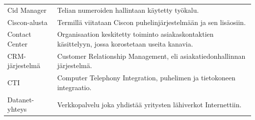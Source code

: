 \documentclass[finnish,12pt,a4paper,pdftex]{article}
\begin{document}
\begin{table}[h!]
\begin{tabular}{ p{5cm}  p{\textwidth-6cm} }
Cid Manager                 & Telian numeroiden hallintaan käytetty työkalu.                                                                                                   \\[0.9em]
Ciscon-alusta               & Termillä viitataan Ciscon puhelinjärjestelmään ja sen lisäosiin.                                                                                 \\[0.9em]
Contact Center              & Organisaation keskitetty toiminto asiakaskontaktien käsittelyyn, jossa korostetaan useita kanavia.                                               \\[0.9em]
CRM-järjestelmä             & Customer Relationship Management, eli asiakatiedonhallinnan järjestelmä.                                                                          \\[0.9em]
CTI                         & Computer Telephony Integration, puhelimen ja tietokoneen integraatio.                                                                             \\[0.9em]
Datanet- yhteys             & Verkkopalvelu joka yhdistää yritysten lähiverkot Internettiin.                                                                                   \\[0.9em]

\end{tabular}
\end{table}
\end{document}
